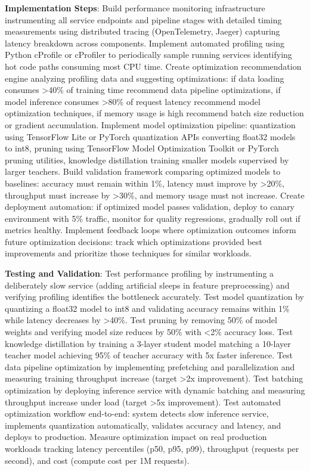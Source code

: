 \textbf{Implementation Steps}: Build performance monitoring infrastructure instrumenting all service endpoints and pipeline stages with detailed timing measurements using distributed tracing (OpenTelemetry, Jaeger) capturing latency breakdown across components. Implement automated profiling using Python cProfile or cProfiler to periodically sample running services identifying hot code paths consuming most CPU time. Create optimization recommendation engine analyzing profiling data and suggesting optimizations: if data loading consumes >40\% of training time recommend data pipeline optimizations, if model inference consumes >80\% of request latency recommend model optimization techniques, if memory usage is high recommend batch size reduction or gradient accumulation. Implement model optimization pipeline: quantization using TensorFlow Lite or PyTorch quantization APIs converting float32 models to int8, pruning using TensorFlow Model Optimization Toolkit or PyTorch pruning utilities, knowledge distillation training smaller models supervised by larger teachers. Build validation framework comparing optimized models to baselines: accuracy must remain within 1\%, latency must improve by >20\%, throughput must increase by >30\%, and memory usage must not increase. Create deployment automation: if optimized model passes validation, deploy to canary environment with 5\% traffic, monitor for quality regressions, gradually roll out if metrics healthy. Implement feedback loops where optimization outcomes inform future optimization decisions: track which optimizations provided best improvements and prioritize those techniques for similar workloads.

\textbf{Testing and Validation}: Test performance profiling by instrumenting a deliberately slow service (adding artificial sleeps in feature preprocessing) and verifying profiling identifies the bottleneck accurately. Test model quantization by quantizing a float32 model to int8 and validating accuracy remains within 1\% while latency decreases by >40\%. Test pruning by removing 50\% of model weights and verifying model size reduces by 50\% with <2\% accuracy loss. Test knowledge distillation by training a 3-layer student model matching a 10-layer teacher model achieving 95\% of teacher accuracy with 5x faster inference. Test data pipeline optimization by implementing prefetching and parallelization and measuring training throughput increase (target >2x improvement). Test batching optimization by deploying inference service with dynamic batching and measuring throughput increase under load (target >5x improvement). Test automated optimization workflow end-to-end: system detects slow inference service, implements quantization automatically, validates accuracy and latency, and deploys to production. Measure optimization impact on real production workloads tracking latency percentiles (p50, p95, p99), throughput (requests per second), and cost (compute cost per 1M requests).

